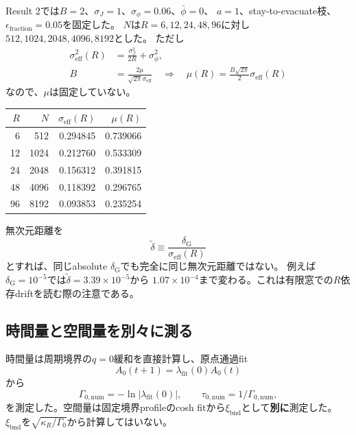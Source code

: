 \documentclass[a4paper,12pt]{ltjsarticle}
\newcommand{\Gauss}{\mathrm G}
\newcommand{\bnd}{\mathrm{bnd}}
\begin{document}
Result 2では$B=2$、$\sigma_J=1$、$\sigma_\phi=0.06$、$\bar\phi=0$、
$a=1$、stay-to-evacuate枝、$\epsilon_{\mathrm{fraction}}=0.05$を固定した。
$N$は$R=6,12,24,48,96$に対し$512,1024,2048,4096,8192$とした。
ただし
\begin{align}
 \sigma_{\mathrm{eff}}^2(R)
 &=\frac{\sigma_J^2}{2R}+\sigma_\phi^2,\\
 B&=\frac{2\mu}{\sqrt{2\pi}\sigma_{\mathrm{eff}}}
 \quad\Longrightarrow\quad
 \boxed{\mu(R)=\frac{B\sqrt{2\pi}}2\sigma_{\mathrm{eff}}(R)}
 \label{eq:mu-fixed-B}
\end{align}
なので、$\mu$は固定していない。

\begin{center}\small
\begin{tabular}{rrrr}
\toprule
$R$ & $N$ & $\sigma_{\mathrm{eff}}(R)$ & $\mu(R)$ \\
\midrule
6  & 512  & 0.294845 & 0.739066 \\
12 & 1024 & 0.212760 & 0.533309 \\
24 & 2048 & 0.156312 & 0.391815 \\
48 & 4096 & 0.118392 & 0.296765 \\
96 & 8192 & 0.093853 & 0.235254 \\
\bottomrule
\end{tabular}
\end{center}

無次元距離を
\begin{equation}
 \widetilde\delta\equiv\frac{\delta_{\Gauss}}{\sigma_{\mathrm{eff}}(R)}
 \label{eq:reduced-delta}
\end{equation}
とすれば、同じabsolute $\delta_{\Gauss}$でも完全に同じ無次元距離ではない。
例えば$\delta_{\Gauss}=10^{-5}$では$\widetilde\delta=3.39\times10^{-5}$から
$1.07\times10^{-4}$まで変わる。これは有限窓での$R$依存driftを読む際の注意である。

\subsection{時間量と空間量を別々に測る}

時間量は周期境界の$q=0$緩和を直接計算し、原点通過fit
\begin{equation}
 A_0(t+1)=\lambda_{\mathrm{fit}}(0)A_0(t)
 \label{eq:q0-direct-fit}
\end{equation}
から
\begin{equation}
 \Gamma_{0,\mathrm{num}}=-\ln|\lambda_{\mathrm{fit}}(0)|,
 \qquad \tau_{0,\mathrm{num}}=1/\Gamma_{0,\mathrm{num}},
 \label{eq:tau-numeric}
\end{equation}
を測定した。空間量は固定境界profileのcosh fitから$\xi_{\bnd}$として\textbf{別に}測定した。
$\xi_{\bnd}$を$\sqrt{\kappa_R/\Gamma_0}$から計算してはいない。
\end{document}
